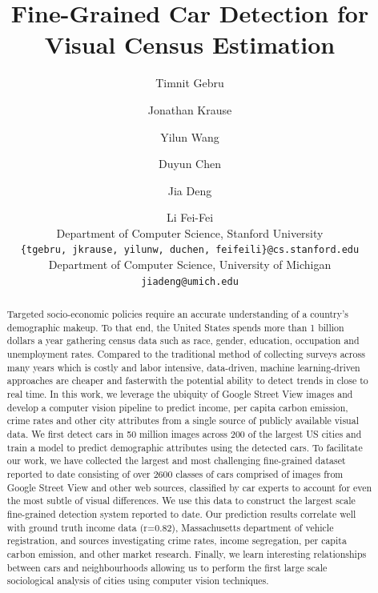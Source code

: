 \documentclass[letterpaper]{article}
\begin{document}
%
\title{Fine-Grained Car Detection for Visual Census Estimation}
\author{Timnit Gebru \and Jonathan Krause \and Yilun Wang \and Duyun Chen \and Jia Deng \and Li Fei-Fei\\
Department of Computer Science, Stanford University\\
{\texttt {\{tgebru, jkrause, yilunw, duchen, feifeili\}@cs.stanford.edu}}\\
Department of Computer Science, University of Michigan\\
\texttt {jiadeng@umich.edu}
}

\maketitle

\begin{abstract}
Targeted socio-economic policies require an accurate understanding of a country's demographic makeup. To that end, the United States spends more than 1 billion dollars a year gathering census data such as race, gender, education, occupation and unemployment rates. Compared to the traditional method of collecting surveys across many years which is costly and labor intensive, data-driven, machine learning-driven approaches are cheaper and faster\textemdash with the potential ability to detect trends in close to real time. In this work, we leverage the ubiquity of Google Street View images and develop a computer vision pipeline to predict income, per capita carbon emission, crime rates and other city attributes from a single source of publicly available visual data. We first detect cars in 50 million images across 200 of the largest US cities and train a model to predict demographic attributes using the detected cars. To facilitate our work, we have collected the largest and most challenging fine-grained dataset reported to date consisting of over 2600 classes of cars comprised of images from Google Street View and other web sources, classified by car experts to account for even the most subtle of visual differences. We use this data to construct the largest scale fine-grained detection system reported to date. Our prediction results correlate well with ground truth income data (r=0.82), Massachusetts department of vehicle registration, and sources investigating crime rates, income segregation, per capita carbon emission, and other market research. Finally, we learn interesting relationships between cars and neighbourhoods allowing us to perform the first large scale sociological analysis of cities using computer vision techniques.

\end{abstract}
\end{document}
